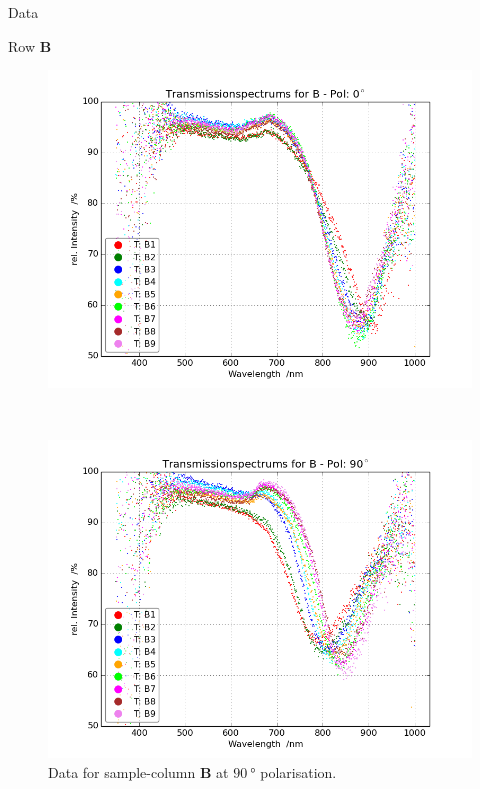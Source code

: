 \begin{appendix}
\begin{chapter}{Data}
\begin{section}{Row \textbf{B}}
      \begin{figure}[ht!]
        \centering
        \begin{minipage}{.92\textwidth}
          \centering
          \includegraphics[width=\textwidth]{Figures/TransspecRAW_BPol0.png}
          \caption{Data for sample-column \textbf{B} at $\SI{0}{\degree}$
              polarisation.}
          \label{fig:TransspecRAW_BPol0}
        \end{minipage}\\
        \begin{minipage}{.92\textwidth}
          \centering
          \includegraphics[width=\textwidth]{Figures/TransspecRAW_BPol90.png}
          \caption{Data for sample-column \textbf{B} at $\SI{90}{\degree}$
              polarisation.}
          \label{fig:TransspecRAW_BPol90}
        \end{minipage}
      \end{figure}
      

\end{section}
\end{chapter}
\end{appendix}
